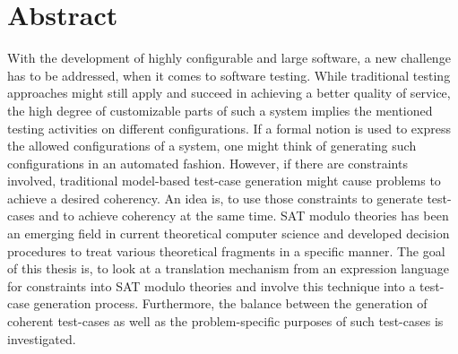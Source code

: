 \chapter*{Abstract}

With the development of highly configurable and large software, a new challenge has to be addressed, when it comes to software testing. While traditional testing approaches might still apply and succeed in achieving a better quality of service, the high degree of customizable parts of such a system implies the mentioned testing activities on different configurations. If a formal notion is used to express the allowed configurations of a system, one might think of generating such configurations in an automated fashion. However, if there are constraints involved, traditional model-based test-case generation might cause problems to achieve a desired coherency. An idea is, to use those constraints to generate test-cases and to achieve coherency at the same time. SAT modulo theories has been an emerging field in current theoretical computer science and developed decision procedures to treat various theoretical fragments in a specific manner. The goal of this thesis is, to look at a translation mechanism from an expression language for constraints into SAT modulo theories and involve this technique into a test-case generation process. Furthermore, the balance between the generation of coherent test-cases as well as the problem-specific purposes of such test-cases is investigated.